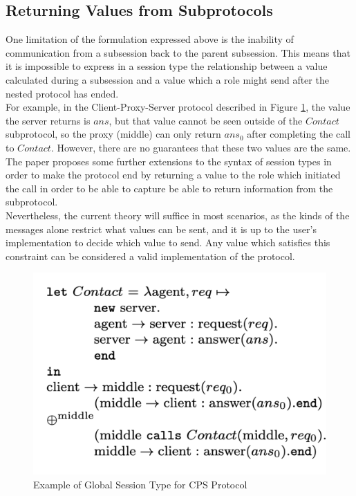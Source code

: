 \documentclass[12pt,twoside]{report}
\newcommand{\comment}[1]{}
\begin{document}
\subsection{Returning Values from Subprotocols}
One limitation of the formulation expressed above is the inability of communication from a subsession back to the parent subsession. This means that it is impossible to express in a session type the relationship between a value calculated during a subsession and a value which a role might send after the nested protocol has ended. \\

For example, in the Client-Proxy-Server protocol described in Figure \ref{nested_session_example}, the value the server returns is $ans$, but that value cannot be seen outside of the $Contact$ subprotocol, so the proxy (middle) can only return $ans_0$ after completing the call to $Contact$. However, there are no guarantees that these two values are the same. The paper proposes some further extensions to the syntax of session types in order to make the protocol end by returning a value to the role which initiated the call in order to be able to capture be able to return information from the subprotocol. \\

Nevertheless, the current theory will suffice in most scenarios, as the kinds of the messages alone restrict what values can be sent, and it is up to the user's implementation to decide which value to send. Any value which satisfies this constraint can be considered a valid implementation of the protocol.
\begin{figure}[h]
    \centering
    \includegraphics[scale=0.5]{nested_session_example.png}
    \caption{Example of Global Session Type for CPS Protocol\cite{nestedprotocols}\comment{nested protocols snippet}}
    \label{nested_session_example}
\end{figure}{}
\end{document}
